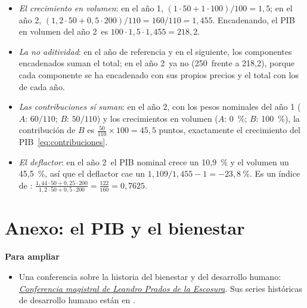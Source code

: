 \documentclass[11pt]{article}
\begin{document}
\begin{itemize}
\item \emph{El crecimiento en volumen}: en el año 1, $(1\cdot50+1\cdot100)/100=1{,}5$; en el año 2, $(1{,}2\cdot50+0{,}5\cdot200)/110=160/110=1{,}455$. Encadenando, el PIB en volumen del año 2~es $100\cdot1{,}5\cdot1{,}455=218{,}2$.
\item \emph{La no aditividad}: en el año de referencia y en el siguiente, los componentes encadenados suman el total; en el año 2~ya no (250~frente a 218,2), porque cada componente se ha encadenado con sus propios precios y el total con los de cada año.
\item \emph{Las contribuciones sí suman}: en el año 2, con los pesos nominales del año 1 ($A$: $60/110$; $B$: $50/110$) y los crecimientos en volumen ($A$: 0~\%; $B$: 100~\%), la contribución de $B$ es $\frac{50}{110}\times100=45{,}5$ puntos, exactamente el crecimiento del PIB~\eqref{eq:contribuciones}.
\item \emph{El deflactor}: en el año 2~el PIB nominal crece un 10,9~\% y el volumen un 45,5~\%, así que el deflactor cae un $1{,}109/1{,}455-1=-23{,}8~\%$. Es un índice de : $\frac{1{,}44\cdot50+0{,}25\cdot200}{1{,}2\cdot50+0{,}5\cdot200}=\frac{122}{160}=0{,}7625$.
\end{itemize}

\section{Anexo: el PIB y el bienestar}\label{anexo:pib-bienestar}

\begin{anotaciones}
\textbf{Para ampliar}
\begin{itemize}
\item Una conferencia sobre la historia del bienestar y del desarrollo humano: \href{https://youtu.be/DRg-HM2GzXw}{\emph{Conferencia magistral de Leandro Prados de la Escosura}}\nocite{FRdP2023Prados}. Sus series históricas de desarrollo humano están en \textcite{Prados2022}.
\end{itemize}
\end{anotaciones}
\end{document}
